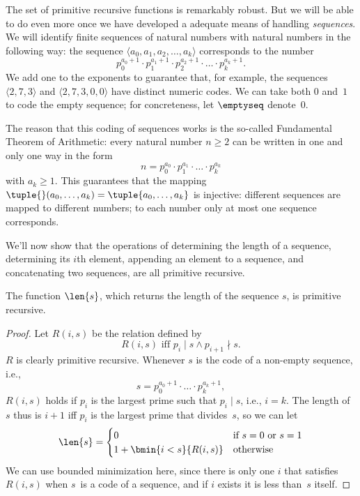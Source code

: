 \documentclass[../../../include/open-logic-section]{subfiles}
\begin{document}

The set of primitive recursive functions is remarkably robust. But we
will be able to do even more once we have developed a adequate means
of handling \emph{sequences}. We will identify finite sequences of
natural numbers with natural numbers in the following way: the
sequence $\langle a_0, a_1, a_2, \dots, a_k \rangle$ corresponds to
the number
\[
p_0^{a_0+1} \cdot p_1^{a_1+1} \cdot p_2^{a_2+1} \cdot \dots \cdot
p_k^{a_k+1}.
\]
We add one to the exponents to guarantee that, for example, the
sequences $\langle 2, 7, 3\rangle$ and $\langle 2, 7, 3, 0, 0 \rangle$
have distinct numeric codes. We can take both $0$ and~$1$ to code the
empty sequence; for concreteness, let $\emptyseq$ denote~$0$.

The reason that this coding of sequences works is the so-called
Fundamental Theorem of Arithmetic: every natural number $n \ge 2$ can
be written in one and only one way in the form
\[
n = p_0^{a_0} \cdot p_1^{a_1} \cdot \dots \cdot p_k^{a_k}
\]
with $a_k \ge 1$. This guarantees that the mapping $\tuple{}(a_0,
\dots, a_k) = \tuple{a_0, \dots, a_k}$ is injective: different
sequences are mapped to different numbers; to each number only at most
one sequence corresponds.

We'll now show that the operations of determining the length of a
sequence, determining its $i$th element, appending an element to a
sequence, and concatenating two sequences, are all primitive
recursive.

\begin{prop}
  The function $\len{s}$, which returns the length of the sequence
  $s$, is primitive recursive.
\end{prop}

\begin{proof}
  Let $R(i, s)$ be the relation defined by
  \[
  R(i, s) \text{ iff }
  p_i \mid s \land p_{i+1} \nmid s.
  \]
  $R$ is clearly primitive recursive. Whenever $s$ is the code of a
  non-empty sequence, i.e.,
  \[
  s = p_0^{a_0+1} \cdot \dots \cdot p_{k}^{a_{k}+1},
  \]
  $R(i,s)$ holds if $p_i$ is the largest prime such that
  $p_i \mid s$, i.e., $i = k$. The length of $s$ thus is $i+1$ iff
  $p_i$ is the largest prime that divides~$s$, so we can let
  \[
  \len{s} =
  \begin{cases}
    0 & \text{if $s = 0$ or $s = 1$} \\
    1 + \bmin{i < s}{R(i, s)} & \text{otherwise}
  \end{cases}
  \]
  We can use bounded minimization here, since there is only one $i$ that
  satisfies $R(i,s)$ when $s$~is a code of a sequence, and if $i$
  exists it is less than~$s$ itself.
\end{proof}
\end{document}
